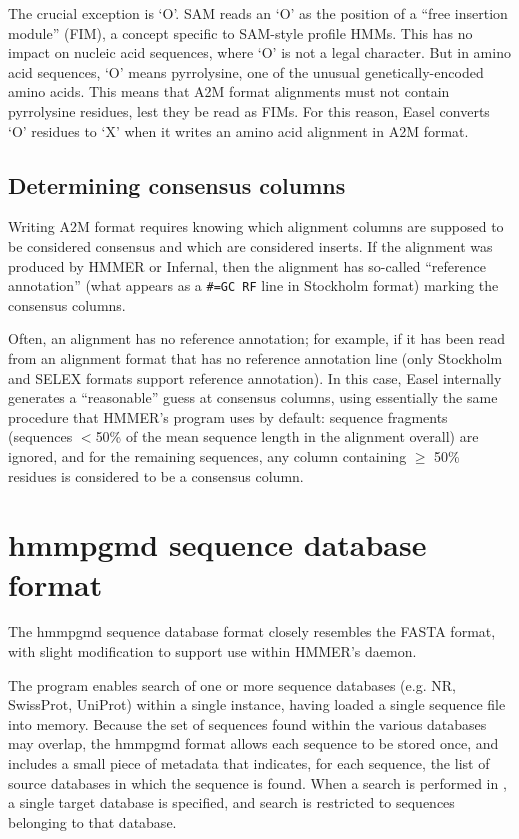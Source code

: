 The crucial exception is `O'. SAM reads an `O' as the position of a
``free insertion module'' (FIM), a concept specific to SAM-style
profile HMMs. This has no impact on nucleic acid sequences, where `O'
is not a legal character. But in amino acid sequences, `O' means
pyrrolysine, one of the unusual genetically-encoded amino acids.  This
means that A2M format alignments must not contain pyrrolysine
residues, lest they be read as FIMs. For this reason, Easel converts
`O' residues to `X' when it writes an amino acid alignment in A2M
format.

\subsection{Determining consensus columns}

Writing A2M format requires knowing which alignment columns are
supposed to be considered consensus and which are considered
inserts. If the alignment was produced by HMMER or Infernal, then the
alignment has so-called ``reference annotation'' (what appears as a
\verb+#=GC RF+ line in Stockholm format) marking the consensus
columns. 

Often, an alignment has no reference annotation; for example, if it
has been read from an alignment format that has no reference
annotation line (only Stockholm and SELEX formats support reference
annotation). In this case, Easel internally generates a ``reasonable''
guess at consensus columns, using essentially the same procedure that
HMMER's  program uses by default: sequence fragments
(sequences $<$50\% of the mean sequence length in the alignment
overall) are ignored, and for the remaining sequences, any column
containing $\geq$ 50\% residues is considered to be a consensus
column.




\section{hmmpgmd sequence database format}

The hmmpgmd sequence database format closely resembles the 
FASTA format, with slight modification to support use within HMMER's
 daemon. 


The  program enables search of one or more sequence 
databases (e.g. NR, SwissProt, UniProt) within a single instance,
having loaded a single sequence file into memory. Because the set of 
sequences found within the various databases may overlap, the hmmpgmd 
format allows each sequence to be stored once, and includes a small piece of
metadata that indicates, for each sequence, the list of source databases in
which the sequence is found. When a search is performed in , a
single target database is specified, and search is restricted to sequences
belonging to that database.

